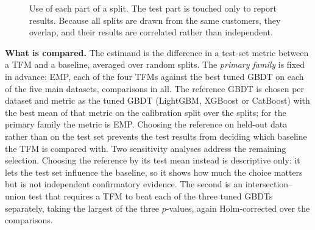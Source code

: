 \documentclass[11pt]{article}
\newcommand{\tfm}{TFM\xspace}
\newcommand{\tfms}{TFMs\xspace}
\begin{document}
\begin{figure}[t]
\centering
{}
\caption{Use of each part of a split. The test part is touched only to report results. Because all \nSeeds{} splits
are drawn from the same customers, they overlap, and their results are correlated rather than independent.}
\label{fig:split}
\end{figure}

\textbf{What is compared.} The estimand is the difference in a test-set metric between a \tfm and a baseline,
averaged over random splits. The \emph{primary family} is fixed in advance: EMP, each of the four \tfms against the best tuned GBDT on each of the five
main datasets, \nPrimary{} comparisons in all. The reference GBDT is chosen per dataset and metric as the tuned GBDT
(LightGBM, XGBoost or CatBoost) with the best mean of that metric on the calibration split over the \nSeeds{} splits; for
the primary family the metric is EMP. Choosing the reference on held-out data rather than on the test set prevents the
test results from deciding which baseline the \tfm is compared with. Two sensitivity analyses address the remaining
selection. Choosing the reference by its test mean instead is descriptive only: it
lets the test set influence the baseline, so it shows how much the choice matters but is not independent
confirmatory evidence. The second is an intersection--union test that requires a \tfm to beat each of the three tuned GBDTs separately, taking the largest of
the three $p$-values, again Holm-corrected over the \nPrimary{} comparisons.
\end{document}
